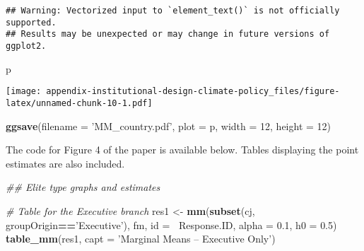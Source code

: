 \documentclass[12pt,a4paper,]{article}
\newenvironment{Shaded}{\begin{snugshade}}{\end{snugshade}}
\newcommand{\CommentTok}[1]{\textcolor[rgb]{0.56,0.35,0.01}{\textit{#1}}}
\newcommand{\DataTypeTok}[1]{\textcolor[rgb]{0.13,0.29,0.53}{#1}}
\newcommand{\DecValTok}[1]{\textcolor[rgb]{0.00,0.00,0.81}{#1}}
\newcommand{\FloatTok}[1]{\textcolor[rgb]{0.00,0.00,0.81}{#1}}
\newcommand{\KeywordTok}[1]{\textcolor[rgb]{0.13,0.29,0.53}{\textbf{#1}}}
\newcommand{\NormalTok}[1]{#1}
\newcommand{\OperatorTok}[1]{\textcolor[rgb]{0.81,0.36,0.00}{\textbf{#1}}}
\newcommand{\StringTok}[1]{\textcolor[rgb]{0.31,0.60,0.02}{#1}}
\begin{document}
\begin{verbatim}
## Warning: Vectorized input to `element_text()` is not officially supported.
## Results may be unexpected or may change in future versions of ggplot2.
\end{verbatim}

\begin{Shaded}
\begin{Highlighting}[]
\NormalTok{p}
\end{Highlighting}
\end{Shaded}

\texttt{[image: appendix-institutional-design-climate-policy\_files/figure-latex/unnamed-chunk-10-1.pdf]}

\begin{Shaded}
\begin{Highlighting}[]
\KeywordTok{ggsave}\NormalTok{(}\DataTypeTok{filename =} \StringTok{'MM_country.pdf'}\NormalTok{, }
       \DataTypeTok{plot =}\NormalTok{ p, }\DataTypeTok{width =} \DecValTok{12}\NormalTok{, }\DataTypeTok{height =} \DecValTok{12}\NormalTok{)}
\end{Highlighting}
\end{Shaded}

The code for Figure 4 of the paper is available below. Tables displaying
the point estimates are also included.

\begin{Shaded}
\begin{Highlighting}[]
\CommentTok{## Elite type graphs and estimates}

\CommentTok{# Table for the Executive branch}
\NormalTok{res1 <-}\StringTok{ }\KeywordTok{mm}\NormalTok{(}\KeywordTok{subset}\NormalTok{(cj, groupOrigin}\OperatorTok{==}\StringTok{'Executive'}\NormalTok{), }
\NormalTok{           fm, }\DataTypeTok{id =} \OperatorTok{~}\NormalTok{Response.ID, }\DataTypeTok{alpha =} \FloatTok{0.1}\NormalTok{, }\DataTypeTok{h0 =} \FloatTok{0.5}\NormalTok{)}
\KeywordTok{table_mm}\NormalTok{(res1, }\DataTypeTok{capt =} \StringTok{'Marginal Means -- Executive Only'}\NormalTok{)}
\end{Highlighting}
\end{Shaded}
\end{document}
